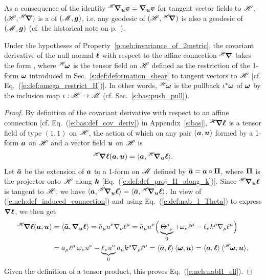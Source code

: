As a consequence of the identity
${}^{\mathscr{H}}\!\bm{\nabla}_{\bm{u}}\bm{v} = \bm{\nabla}_{\bm{u}}\bm{v}$ for tangent vector fields to $\mathscr{H}$,
$(\mathscr{H}, {}^{\mathscr{H}}\!\bm{\nabla})$ is a 
of $(\mathscr{M},\bm{g})$,
i.e. any geodesic of $(\mathscr{H}, {}^{\mathscr{H}}\!\bm{\nabla})$ is also a geodesic of $(\mathscr{M},\bm{g})$
(cf. the historical note on p.~\pageref{h:neh:NEH}).

\begin{prop}
\label{p:neh:Hnab_l}
Under the hypotheses of Property~\ref{p:neh:invariance_of_2metric},
the covariant derivative of the null normal $\bm{\ell}$ with respect to the affine
connection ${}^{\mathscr{H}}\!\bm{\nabla}$ takes the form
\be \label{e:neh:nabH_ell}
   \encadre{ {}^\Hor\!\wnab \wl = \wl \otimes {}^\Hor\!\w{\omega} },
\ee
where ${}^{\mathscr{H}}\!\bm{\omega}$ is the tensor field on $\mathscr{H}$
defined as the restriction of the 1-form $\bm{\omega}$
introduced in Sec.~\ref{s:def:deformation_shear}
to tangent vectors to $\mathscr{H}$ [cf. Eq.~(\ref{e:def:omega_restrict_H})].
In other words, ${}^{\mathscr{H}}\!\bm{\omega}$ is the pullback $\iota^*\bm{\omega}$ of
$\bm{\omega}$ by the inclusion map $\iota: \mathscr{H} \to \mathscr{M}$ (cf. Sec.~\ref{s:bas:push_pull}).
\end{prop}
\begin{proof}
By definition of the covariant derivative with respect to an
affine connection [cf. Eq.~(\ref{e:bas:def_cov_deriv}) in Appendix~\ref{s:bas}],
${}^{\mathscr{H}}\!\bm{\nabla} \bm{\ell}$ is a tensor field of type $(1,1)$ on $\mathscr{H}$,
the action of which on any pair
$(\bm{a}, \bm{u})$ formed by a 1-form $\bm{a}$ on $\mathscr{H}$ and a vector field $\bm{u}$
on $\mathscr{H}$ is
\[
    {}^{\mathscr{H}}\!\bm{\nabla} \bm{\ell} (\bm{a}, \bm{u}) = \langle \bm{a}, {}^{\mathscr{H}}\!\bm{\nabla}_{\bm{u}} \bm{\ell} \rangle .
\]
Let $\bm{\bar{a}}$ be the extension of $\bm{a}$ to a 1-form on $\mathscr{M}$ defined by
$\bm{\bar{a}} = \bm{a} \circ \bm{\Pi}$, where $\bm{\Pi}$ is the projector onto $\mathscr{H}$
along $\bm{k}$ [Eq.~(\ref{e:def:def_proj_H_along_k})]. Since ${}^{\mathscr{H}}\!\bm{\nabla}_{\bm{u}} \bm{\ell}$
is tangent to $\mathscr{H}$, we have
$\langle \bm{a}, {}^{\mathscr{H}}\!\bm{\nabla}_{\bm{u}} \bm{\ell} \rangle = \langle \bm{\bar{a}}, {}^{\mathscr{H}}\!\bm{\nabla}_{\bm{u}} \bm{\ell} \rangle$.
In view of (\ref{e:neh:def_induced_connection}) and using Eq.~(\ref{e:def:nab_l_Theta})
to express $\bm{\nabla}\bm{\ell}$, we then get
\begin{align}
    {}^{\mathscr{H}}\!\bm{\nabla} \bm{\ell} (\bm{a}, \bm{u}) & = \langle \bm{\bar{a}}, \bm{\nabla}_{\bm{u}} \bm{\ell} \rangle
       = \bar{a}_\mu u^\nu \nabla_\nu \ell^\mu
       = \bar{a}_\mu u^\nu \Big( \underbrace{\Theta^\mu_{\ \, \nu}}_{0} + \omega_\nu \ell^\mu
            - \ell_\nu k^\rho \nabla_\rho \ell^\mu \Big)
        \nonumber \\
        & = \bar{a}_\mu \ell^\mu \, \omega_\nu u^\nu - \underbrace{\ell_\nu u^\nu}_{0}
            \bar{a}_\mu k^\rho \nabla_\rho \ell^\mu
             = \langle \bm{\bar{a}}, \bm{\ell} \rangle \, \langle \bm{\omega}, \bm{u} \rangle
             = \langle \bm{a}, \bm{\ell} \rangle \, \langle {}^{\mathscr{H}}\!\bm{\omega}, \bm{u} \rangle . \nonumber
\end{align}
Given the definition of a tensor product,
this proves Eq.~(\ref{e:neh:nabH_ell}).
\end{proof}
